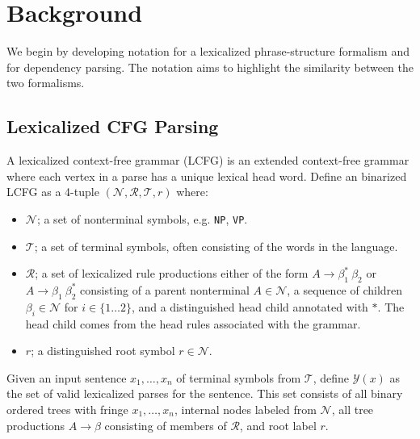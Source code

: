 \documentclass[11pt,letterpaper]{article}
\newcommand{\nonterms}{\mathcal{N}}
\newcommand{\rules}{\mathcal{R}}
\newcommand{\terms}{\mathcal{T}}
\newcommand{\Tag}[1]{\texttt{#1}}
\newcommand{\Root}{r}
\newcommand{\RuleA}[3]{#1 \rightarrow #2^*\ #3}
\newcommand{\RuleB}[3]{#1 \rightarrow #2\ #3^*}
\begin{document}

\section{Background}

We begin by developing notation for a lexicalized phrase-structure formalism and for dependency parsing. The notation aims to highlight the similarity between the two formalisms.

\subsection{Lexicalized CFG Parsing}

A lexicalized context-free grammar (LCFG) is an extended context-free grammar where each vertex in a parse has a unique lexical head word. Define an binarized LCFG as a 4-tuple $(\nonterms, \rules, \terms, \Root)$ where:
\begin{itemize}
\item $\nonterms$; a set of nonterminal symbols, e.g. \Tag{NP}, \Tag{VP}.
\item $\terms$; a set of terminal symbols, often consisting of the words in the language.
\item $\rules$; a set of lexicalized rule productions either of the form $\RuleA{A}{\beta_1}{\beta_2}$ or $\RuleB{A}{\beta_1}{\beta_2}$  consisting of a parent nonterminal $A \in \nonterms$, a sequence of children $\beta_i \in \nonterms$ for $i \in \{1\ldots 2\}$, and a distinguished head child annotated with $*$. The head child comes from the head rules associated with the grammar.
\item $\Root$; a distinguished root symbol $\Root \in \nonterms$.
\end{itemize}

Given an input sentence $x_1, \ldots, x_n$ of terminal symbols from $\terms$, define $\mathcal{Y}(x)$ as the set of valid lexicalized parses for the sentence. This set consists of all binary ordered trees with fringe $x_1, \ldots,  x_n$, internal nodes labeled from $\nonterms$, all tree productions  $A \rightarrow \beta$ consisting of members of $\rules$, and root label $\Root$.


\end{document}
